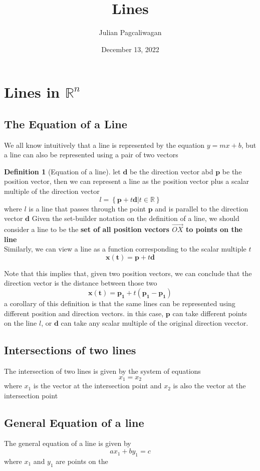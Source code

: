 \documentclass{report}
\title{Lines}
\author{Julian Pagcaliwagan}
\date{December 13, 2022}
\theoremstyle{definition}
\newtheorem{definition}{Definition}
\begin{document}
\maketitle
\section*{Lines in $ \mathbb{R}^n $}
    \subsection*{The Equation of a Line}
        \noindent We all know intuitively that a line is represented by the equation $ y = mx + b $, but a line can also be represented using a pair of two vectors
        \begin{definition}[Equation of a line]
            let $ \mathbf{d}$ be the direction vector abd $ \mathbf{p} $ be the position vector, then we can represent a line as 
            the position vector plus a scalar multiple of the direction vector
            \[
                l = \left\{ \mathbf{p} + t \mathbf{d} | t \in\mathbb{R} \right\}
            \]
            where $ l $ is a line that passes through the point $ \mathbf{p} $ and is parallel to the direction vector $ \mathbf{d} $
            Given the set-builder notation on the definition of a line, we should consider a line to be the \textbf{set of all position vectors $ \overrightarrow{OX}$ to points on the line}\\
            Similarly, we can view a line as a function corresponding to the scalar multiple $ t $
            \[
                \mathbf{x(t)} = \mathbf{p} + t \mathbf{d}
            \]
        
            \noindent Note that this implies that, given two position vectors, we can conclude that the direction vector is the distance between those two
            \[
                \mathbf{x(t)} = \mathbf{ \mathbf{p_1}} + t ( \mathbf{ \mathbf{p_1}} - \mathbf{ \mathbf{p_1}})
            \]
            \noindent a corollary of this definition is that the same lines can be represented using different position and direction vectors. in this case, $ \mathbf{p} $ can take different points on the line $ l $, or $ \mathbf{d} $ can take any scalar multiple of the original direction vecctor.

        \end{definition}
    \subsection*{Intersections of two lines}
        The intersection of two lines is given by the system of equations
        \[
            x_1 = x_2
        \]
        where $ x_1 $ is the vector at the intersection point and $ x_2 $ is also the vector at the intersection point
    \subsection*{General Equation of a line}
        The general equation of a line is given by
        \[
            ax_1 + by_1 = c
        \]
        where $ x_1 $ and $ y_1 $ are points on the     
\end{document}
